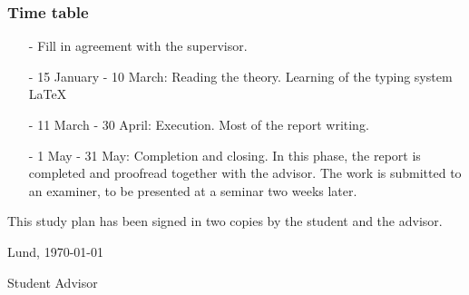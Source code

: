 \documentclass[en,cm,10pt]{inst}
\begin{document}
	\subsubsection*{Time table}
	\begin{itemize}
        \item[-] Fill in agreement with the supervisor.
        \item[-] 15 January - 10 March: Reading the theory. Learning of the typing system LaTeX 
        \item[-] 11 March - 30 April: Execution. Most of the report writing.
        \item[-] 1 May - 31 May: Completion and closing. In this phase, the report is completed and proofread together with the advisor. The work is submitted to an examiner, to be presented at a seminar two weeks later.
    \end{itemize}
	\vspace{0.5cm}
    
	\noindent This study plan has been signed in two copies by the student and the advisor.
	
	\vspace{0.5cm}
	\noindent
	Lund, \today
	
	\vspace{1.0cm}
	\noindent Student \hspace{5cm}Advisor
	
	
\end{document}
